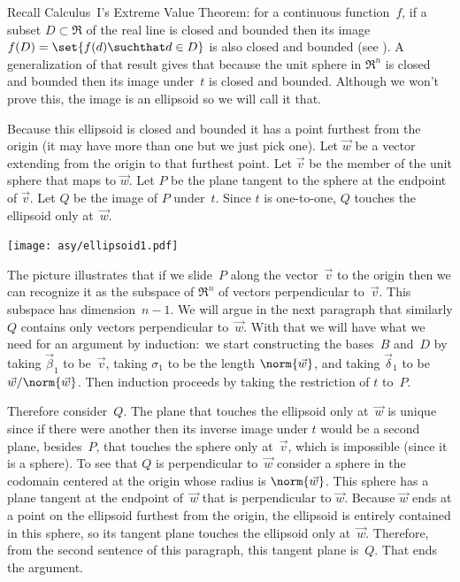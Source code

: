Recall Calculus~I's Extreme Value Theorem: for a continuous
function~$f$, if a subset $D\subset \Re$ of the real line 
is closed and bounded then
its image $f(D)=\set{f(d)\suchthat d\in D}$ 
is also closed and bounded (see \cite{wiki:ExtremeValueThm}).
A generalization of that result gives that because the unit sphere in $\Re^n$
is closed and bounded then its image under~$t$ is closed and bounded.
Although we won't prove this, the image is an ellipsoid
so we will call it that. 

Because this ellipsoid is closed and bounded it has a 
point furthest from the origin (it may have more than one but we just pick one).
Let $\vec{w}$ be a vector extending from the origin to that furthest point.
Let $\vec{v}$ be the member of the unit sphere that maps to $\vec{w}$.
Let $P$ be the plane tangent to the sphere at the endpoint of $\vec{v}$.
Let $Q$ be the image of $P$ under~$t$.
Since $t$ is one-to-one, $Q$ touches the ellipsoid only at~$\vec{w}$.
\begin{center}
  \texttt{[image: asy/ellipsoid1.pdf]}
\end{center}

The picture illustrates that if we slide~$P$ along the 
vector~$\vec{v}$ to
the origin then we can recognize it as 
the subspace of $\Re^n$ of vectors perpendicular
to~$\vec{v}$.
This subspace has dimension~$n-1$. 
We will argue in the next paragraph 
that similarly $Q$ contains only
vectors perpendicular to~$\vec{w}$.
With that we will have what we need for an argument by induction:~we 
start constructing the 
bases~$B$ and~$D$ by taking $\vec{\beta}_1$ to be~$\vec{v}$, taking
$\sigma_1$ to be the length $\norm{\vec{w}}$, and taking
$\vec{\delta}_1$ to be $\vec{w}/\norm{\vec{w}}$.
Then induction proceeds by taking the restriction of $t$ to~$P$.

Therefore consider~$Q$.
The plane that touches the ellipsoid
only at~$\vec{w}$ is unique since if there were another then its inverse image
under $t$
would be a second plane, besides~$P$, 
that touches the sphere only at~$\vec{v}$, which is impossible (since it is a
sphere).
To see that $Q$ is perpendicular to~$\vec{w}$ consider a sphere in the codomain
centered at the origin whose radius is $\norm{\vec{w}}$.
This sphere has a plane tangent at the endpoint of~$\vec{w}$ 
that is perpendicular
to $\vec{w}$.
Because $\vec{w}$ ends at a point on the ellipsoid furthest from the origin,
the ellipsoid is entirely contained in this sphere, so its tangent plane 
touches the ellipsoid only at~$\vec{w}$.
Therefore, from the second sentence of this paragraph, 
this tangent plane is~$Q$. 
That ends the argument.



